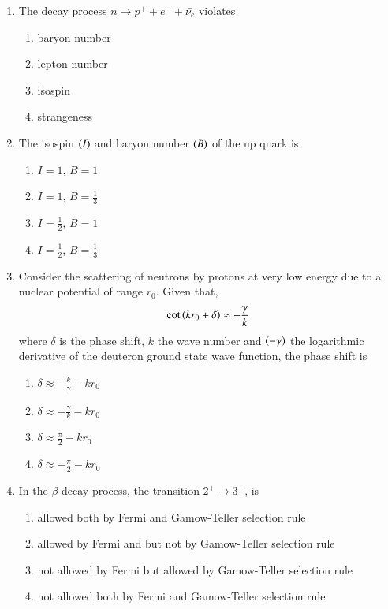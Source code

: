 \documentclass[journal,12pt,onecolumn]{IEEEtran}
\theoremstyle{remark}
\begin{document}
\begin{enumerate}
\item The decay process $n \to p^+ + e^- + \bar{\nu_e}$ violates
\hfill{}
\begin{enumerate}
\item baryon number
\item lepton number
\item isospin
\item strangeness
\end{enumerate}

\item The isospin $\left(I\right)$ and baryon number $\left(B\right)$ of the up quark is
\hfill{}
\begin{enumerate}
\item $I=1$, $B=1$
\item $I=1$, $B=\frac{1}{3}$
\item $I=\frac{1}{2}$, $B=1$
\item $I=\frac{1}{2}$, $B=\frac{1}{3}$
\end{enumerate}

\item Consider the scattering of neutrons by protons at very low energy due to a nuclear potential of range $r_0$. Given that,
\begin{align*}
\cot\left(kr_0 + \delta\right) \approx -\frac{\gamma}{k}
\end{align*}
where $\delta$ is the phase shift, $k$ the wave number and $\left(-\gamma\right)$ the logarithmic derivative of the deuteron ground state wave function, the phase shift is
\hfill{}
\begin{enumerate}
\item $\delta \approx -\frac{k}{\gamma} - kr_0$
\item $\delta \approx -\frac{\gamma}{k} - kr_0$
\item $\delta \approx \frac{\pi}{2} - kr_0$
\item $\delta \approx -\frac{\pi}{2} - kr_0$
\end{enumerate}

\item In the $\beta$ decay process, the transition $2^+ \to 3^+$, is
\hfill{}
\begin{enumerate}
\item allowed both by Fermi and Gamow-Teller selection rule
\item allowed by Fermi and but not by Gamow-Teller selection rule
\item not allowed by Fermi but allowed by Gamow-Teller selection rule
\item not allowed both by Fermi and Gamow-Teller selection rule
\end{enumerate}


\end{enumerate}
\end{document}

